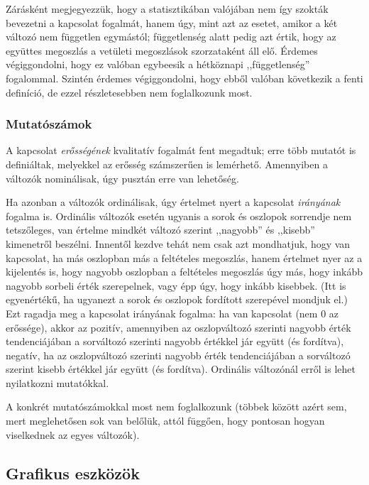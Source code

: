 \documentclass[
]{book}
\begin{document}
Zárásként megjegyezzük, hogy a statisztikában valójában nem így szokták bevezetni a kapcsolat fogalmát, hanem úgy, mint azt az esetet, amikor a két változó nem független egymástól; függetlenség alatt pedig azt értik, hogy az együttes megoszlás a vetületi megoszlások szorzataként áll elő. Érdemes végiggondolni, hogy ez valóban egybeesik a hétköznapi ,,függetlenség'' fogalommal. Szintén érdemes végiggondolni, hogy ebből valóban következik a fenti definíció, de ezzel részletesebben nem foglalkozunk most.

\hypertarget{deskriptivminketvaltanalitikusmutatoszamok}{%
\subsubsection{Mutatószámok}\label{deskriptivminketvaltanalitikusmutatoszamok}}

A kapcsolat \emph{erősségének} kvalitatív fogalmát fent megadtuk; erre több mutatót is definiáltak, melyekkel az erősség számszerűen is lemérhető. Amennyiben a változók nominálisak, úgy pusztán erre van lehetőség.

Ha azonban a változók ordinálisak, úgy értelmet nyert a kapcsolat \emph{irányának} fogalma is. Ordinális változók esetén ugyanis a sorok és oszlopok sorrendje nem tetszőleges, van értelme mindkét változó szerint ,,nagyobb'' és ,,kisebb'' kimenetről beszélni. Innentől kezdve tehát nem csak azt mondhatjuk, hogy van kapcsolat, ha más oszlopban más a feltételes megoszlás, hanem értelmet nyer az a kijelentés is, hogy nagyobb oszlopban a feltételes megoszlás úgy más, hogy inkább nagyobb sorbeli érték szerepelnek, vagy épp úgy, hogy inkább kisebbek. (Itt is egyenértékű, ha ugyanezt a sorok és oszlopok fordított szerepével mondjuk el.) Ezt ragadja meg a kapcsolat irányának fogalma: ha van kapcsolat (nem 0 az erőssége), akkor az pozitív, amennyiben az oszlopváltozó szerinti nagyobb érték tendenciájában a sorváltozó szerinti nagyobb értékkel jár együtt (és fordítva), negatív, ha az oszlopváltozó szerinti nagyobb érték tendenciájában a sorváltozó szerint kisebb értékkel jár együtt (és fordítva). Ordinális változónál erről is lehet nyilatkozni mutatókkal.

A konkrét mutatószámokkal most nem foglalkozunk (többek között azért sem, mert meglehetősen sok van belőlük, attól függően, hogy pontosan hogyan viselkednek az egyes változók).

\hypertarget{deskriptivminketvaltgrafikus}{%
\subsection{Grafikus eszközök}\label{deskriptivminketvaltgrafikus}}
\end{document}
